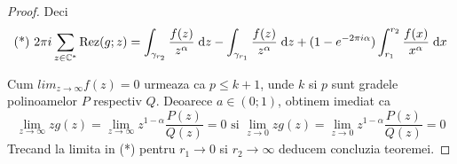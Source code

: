\begin{theorem}
\begin{proof}
            Deci
            \[
               \text{(*) } 2 \pi i  \sum_{z\in \mathbb{C}^*} \operatorname{Rez}(g;z)
                    = \int_{\gamma_{r_2}} \frac{f(z)}{z^\alpha} \; \mathrm{d} z
                    - \int_{\gamma_{r_1}} \frac{f(z)}{z^\alpha} \; \mathrm{d} z
                    + (1-e^{-2\pi i \alpha}) \int_{r_1}^{r_2} \frac{f(x)}{x^\alpha} \; \mathrm{d} x
            \]

            Cum $\displaystyle lim_{z\to\infty} f(z) = 0$ urmeaza ca $p \leq k+1$, unde $k$ si $p$
            sunt gradele polinoamelor $P$ respectiv $Q$. Deoarece $a \in (0;1)$, obtinem imediat
            ca
            \[
                \lim_{z\to\infty} z g(z) = \lim_{z\to\infty} z^{1-\alpha} \frac{P(z)}{Q(z)} = 0
                \text{ si }
                \lim_{z\to 0} z g(z) = \lim_{z\to 0} z^{1-\alpha} \frac{P(z)}{Q(z)} = 0
            \]
            Trecand la limita in (*) pentru $r_1 \to 0$ si $r_2 \to \infty$ deducem concluzia teoremei.
        \end{proof}
    \end{theorem}

